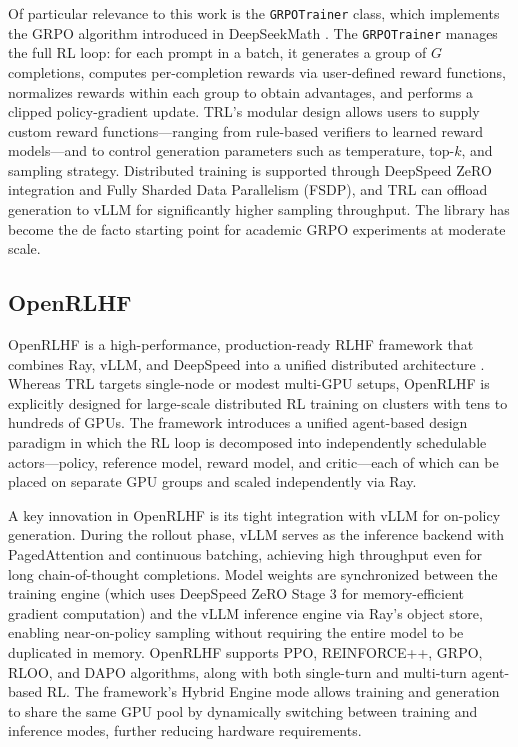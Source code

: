 Of particular relevance to this work is the \texttt{GRPOTrainer} class, which implements the GRPO algorithm introduced in DeepSeekMath \cite{shao2024deepseekmath}. The \texttt{GRPOTrainer} manages the full RL loop: for each prompt in a batch, it generates a group of $G$ completions, computes per-completion rewards via user-defined reward functions, normalizes rewards within each group to obtain advantages, and performs a clipped policy-gradient update. TRL's modular design allows users to supply custom reward functions---ranging from rule-based verifiers to learned reward models---and to control generation parameters such as temperature, top-$k$, and sampling strategy. Distributed training is supported through DeepSpeed ZeRO integration and Fully Sharded Data Parallelism (FSDP), and TRL can offload generation to vLLM for significantly higher sampling throughput. The library has become the de facto starting point for academic GRPO experiments at moderate scale.

\subsection{OpenRLHF}

OpenRLHF is a high-performance, production-ready RLHF framework that combines Ray, vLLM, and DeepSpeed into a unified distributed architecture \cite{hu2024openrlhf}. Whereas TRL targets single-node or modest multi-GPU setups, OpenRLHF is explicitly designed for large-scale distributed RL training on clusters with tens to hundreds of GPUs. The framework introduces a unified agent-based design paradigm in which the RL loop is decomposed into independently schedulable actors---policy, reference model, reward model, and critic---each of which can be placed on separate GPU groups and scaled independently via Ray.

A key innovation in OpenRLHF is its tight integration with vLLM for on-policy generation. During the rollout phase, vLLM serves as the inference backend with PagedAttention and continuous batching, achieving high throughput even for long chain-of-thought completions. Model weights are synchronized between the training engine (which uses DeepSpeed ZeRO Stage 3 for memory-efficient gradient computation) and the vLLM inference engine via Ray's object store, enabling near-on-policy sampling without requiring the entire model to be duplicated in memory. OpenRLHF supports PPO, REINFORCE++, GRPO, RLOO, and DAPO algorithms, along with both single-turn and multi-turn agent-based RL. The framework's Hybrid Engine mode allows training and generation to share the same GPU pool by dynamically switching between training and inference modes, further reducing hardware requirements.

